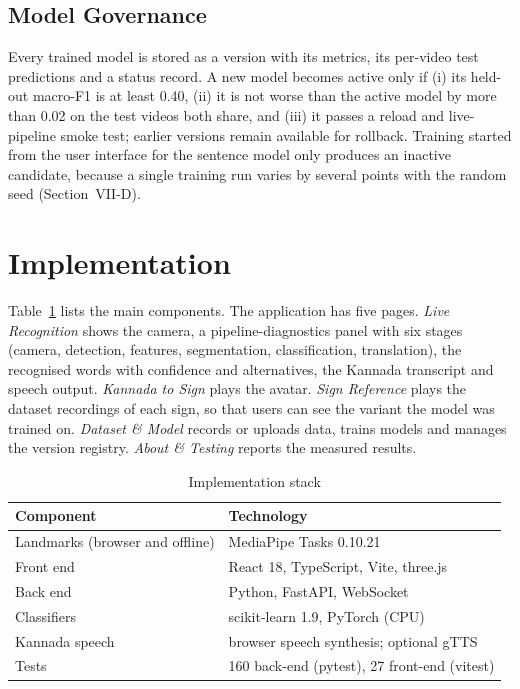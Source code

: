 \documentclass[conference]{IEEEtran}
\begin{document}
\subsection{Model Governance}
Every trained model is stored as a version with its metrics, its per-video test predictions and a status record. A new model becomes active only if (i) its held-out macro-F1 is at least 0.40, (ii) it is not worse than the active model by more than 0.02 on the test videos both share, and (iii) it passes a reload and live-pipeline smoke test; earlier versions remain available for rollback. Training started from the user interface for the sentence model only produces an inactive candidate, because a single training run varies by several points with the random seed (Section~VII-D).

\section{Implementation}
Table~\ref{tab:stack} lists the main components. The application has five pages. \textit{Live Recognition} shows the camera, a pipeline-diagnostics panel with six stages (camera, detection, features, segmentation, classification, translation), the recognised words with confidence and alternatives, the Kannada transcript and speech output. \textit{Kannada to Sign} plays the avatar. \textit{Sign Reference} plays the dataset recordings of each sign, so that users can see the variant the model was trained on. \textit{Dataset \& Model} records or uploads data, trains models and manages the version registry. \textit{About \& Testing} reports the measured results.

\begin{table}[t]
\caption{Implementation stack}
\label{tab:stack}
\centering
\begin{tabular}{@{}ll@{}}
\toprule
Component & Technology \\
\midrule
Landmarks (browser and offline) & MediaPipe Tasks 0.10.21 \\
Front end & React 18, TypeScript, Vite, three.js \\
Back end & Python, FastAPI, WebSocket \\
Classifiers & scikit-learn 1.9, PyTorch (CPU) \\
Kannada speech & browser speech synthesis; optional gTTS \\
Tests & 160 back-end (pytest), 27 front-end (vitest) \\
\bottomrule
\end{tabular}
\end{table}
\end{document}
